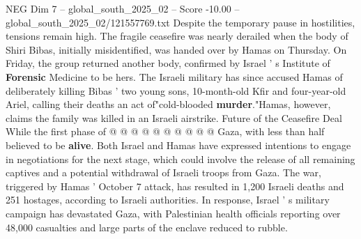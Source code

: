 \begin{textsample}{NEG Dim 7 – global\_south\_2025\_02 – Score -10.00 – global\_south\_2025\_02/121557769.txt}
Despite the temporary pause in hostilities, tensions remain high.
The fragile ceasefire was nearly derailed when the body of Shiri Bibas, initially misidentified, was handed over by Hamas on Thursday.
On Friday, the group returned another body, confirmed by Israel ' s Institute of \textbf{Forensic} Medicine to be hers.
The Israeli military has since accused Hamas of deliberately killing Bibas ' two young sons, 10-month-old Kfir and four-year-old Ariel, calling their deaths an act of"cold-blooded \textbf{murder}."Hamas, however, claims the family was killed in an Israeli airstrike.
Future of the Ceasefire Deal While the first phase of @ @ @ @ @ @ @ @ @ @ Gaza, with less than half believed to be \textbf{alive}.
Both Israel and Hamas have expressed intentions to engage in negotiations for the next stage, which could involve the release of all remaining captives and a potential withdrawal of Israeli troops from Gaza.
The war, triggered by Hamas ' October 7 attack, has resulted in 1,200 Israeli deaths and 251 hostages, according to Israeli authorities.
In response, Israel ' s military campaign has devastated Gaza, with Palestinian health officials reporting over 48,000 casualties and large parts of the enclave reduced to rubble.

\end{textsample}
